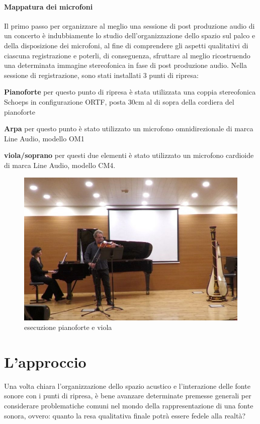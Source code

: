 	\paragraph{Mappatura dei microfoni}
	Il primo passo per organizzare al meglio una sessione di post produzione audio di un concerto è indubbiamente lo studio dell'organizzazione dello spazio sul palco e della disposizione dei microfoni, al fine di comprendere gli aspetti qualitativi di ciascuna registrazione e poterli, di conseguenza, sfruttare al meglio ricostruendo una determinata immagine stereofonica in fase di post produzione audio.
	Nella sessione di registrazione, sono stati installati 3 punti di ripresa:
		\begin{compactitem}
			\item \textbf{Pianoforte} per questo punto di ripresa è stata utilizzata una coppia stereofonica Schoeps in configurazione ORTF, posta 30cm al di sopra della cordiera del pianoforte
			\item \textbf{Arpa} per questo punto è stato utilizzato un microfono omnidirezionale di marca Line Audio, modello OM1
			\item \textbf{viola/soprano} per questi due elementi è stato utilizzato un microfono cardioide di marca Line Audio, modello CM4.
		\end{compactitem}
	
	\begin{figure}[h]
		\begin{center}
			\includegraphics[width= .50\textwidth, height = .15\textheight]{img/image2.jpg}
			\caption{esecuzione pianoforte e viola}
		\end{center}
	\end{figure}

\section{L'approccio}
Una volta chiara l'organizzazione dello spazio acustico e l'interazione delle fonte sonore con i punti di ripresa, è bene avanzare determinate premesse generali per considerare problematiche comuni nel mondo della rappresentazione di una fonte sonora, ovvero: quanto la resa qualitativa finale potrà essere fedele alla realtà?

